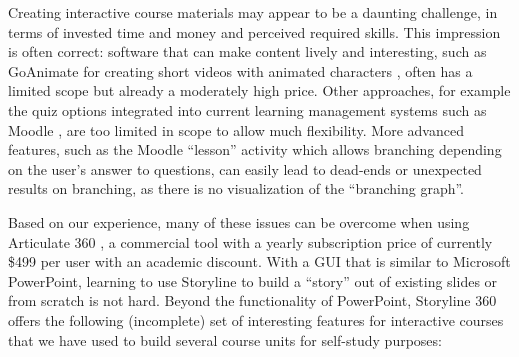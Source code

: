 \documentclass[sigconf]{acmart}
\begin{document}
Creating interactive course materials may appear to be a daunting challenge, in terms of invested
time and money and perceived required skills. This impression is often correct: software that can
make content lively and interesting, such as GoAnimate for creating short videos with animated
characters \cite{GoAnimate}, often has a limited scope but already a moderately high price. 
Other approaches, for example the quiz options integrated into current learning management systems
such as Moodle \cite{Moodle}, are too limited in scope to allow much flexibility. More advanced
features, such as the Moodle ``lesson'' activity which allows branching depending on the user's answer
to questions, can easily lead to dead-ends or unexpected results on branching, as there is no visualization 
of the ``branching graph''.

Based on our experience, many of these issues can be overcome when using Articulate 360
\cite{Storyline}, a commercial tool with a yearly subscription price of currently \$499 per user
with an academic discount. With a GUI that is similar to Microsoft PowerPoint, learning to use
Storyline to build a ``story'' out of existing slides or from scratch is not hard. Beyond the functionality
of PowerPoint, Storyline 360 offers the following (incomplete) set of interesting features for
interactive courses that we have used to build several course units for self-study purposes:
\end{document}
